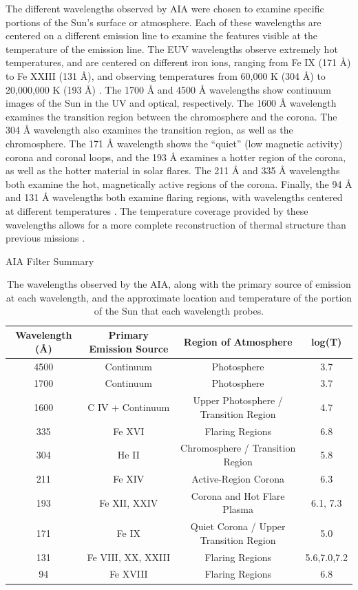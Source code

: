 \documentclass[12pt, letterpaper]{article}
\begin{document}
The different wavelengths observed by AIA were chosen to examine specific portions of the Sun’s surface or atmosphere. Each of these wavelengths are centered on a different emission line to examine the features visible at the temperature of the emission line. The EUV wavelengths observe extremely hot temperatures, and are centered on different iron ions, ranging from Fe IX (171 Å) to Fe XXIII (131 Å), and observing temperatures from 60,000 K (304 Å) to 20,000,000 K (193 Å) \cite{Lemen2012}. The 1700 Å and 4500 Å wavelengths show continuum images of the Sun in the UV and optical, respectively. The 1600 Å wavelength examines the transition region between the chromosphere and the corona. The 304 Å wavelength also examines the transition region, as well as the chromosphere. The 171 Å wavelength shows the “quiet” (low magnetic activity) corona and coronal loops, and the 193 Å examines a hotter region of the corona, as well as the hotter material in solar flares. The 211 Å and 335 Å wavelengths both examine the hot, magnetically active regions of the corona. Finally, the 94 Å and 131 Å wavelengths both examine flaring regions, with wavelengths centered at different temperatures \cite{Zell2015}. The temperature coverage provided by these wavelengths allows for a more complete reconstruction of thermal structure than previous missions \cite{AIA_ConceptReport}.

\begin{table}
	\centering
	\caption*{AIA Filter Summary}
	\begin{tabular}{||c| c | c | c ||} 
		\hline
		Wavelength (\AA) & Primary Emission Source & Region of Atmosphere & log(T)\\ [0.5ex] 
		\hline\hline
		4500 & Continuum & Photosphere & 3.7 \\
		\hline
		1700 & Continuum & Photosphere & 3.7 \\
		\hline
		1600 & C IV + Continuum & Upper Photosphere / Transition Region & 4.7 \\
		\hline
		335 & Fe XVI & Flaring Regions & 6.8 \\
		\hline
		304 & He II & Chromosphere / Transition Region & 5.8 \\
		\hline
		211 & Fe XIV & Active-Region Corona & 6.3 \\
		\hline
		193 & Fe XII, XXIV & Corona and Hot Flare Plasma & 6.1, 7.3 \\
		\hline 
		171 & Fe IX & Quiet Corona / Upper Transition Region & 5.0 \\
		\hline
		131 & Fe VIII, XX, XXIII & Flaring Regions & 5.6,7.0,7.2 \\
		\hline
		94 & Fe XVIII & Flaring Regions & 6.8 \\
		\hline
		
	\end{tabular}
	\vspace{0.5em}
	\caption{The wavelengths observed by the AIA, along with the primary source of emission at each wavelength, and the approximate location and temperature of the portion of the Sun that each wavelength probes. \cite{AIA_ConceptReport}}
	\label{AIA_wavelengths}
\end{table}
\end{document}

